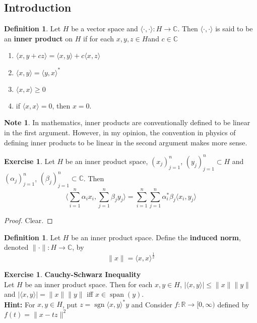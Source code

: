 \documentclass[12pt]{amsart}
\theoremstyle{definition}
\newtheorem{defn}[definition]{Definition}
\newtheorem{note}[definition]{Note}
\newtheorem{ex}[definition]{Exercise}
\newcommand{\al}{\alpha}
\newcommand{\be}{\beta}
\newcommand{\C}{\mathbb{C}}
\newcommand{\R}{\mathbb{R}}
\renewcommand{\r}{\rangle}
\renewcommand{\l}{\langle}
\newcommand{\Rg}{[0,\infty)}
\DeclareMathOperator{\sgn}{sgn}
\DeclareMathOperator{\spn}{span}
\newcommand{\lex}[1]{\label{ex:#1}}
\newcommand{\ld}[1]{\label{defn:#1}}
\begin{document}
	\subsection{Introduction}
	
	\begin{defn} \ld{}
		Let $H$ be a vector space and $\l \cdot, \cdot \r: H \rightarrow \C$. Then $\l \cdot, \cdot \r$ is said to be an \textbf{inner product} on $H$ if for each $x,y,z \in H$and $c \in \C$
		\begin{enumerate}
			\item $\l x , y + cz\r = \l x , y \r + c\l x , z\r $
			\item $\l x , y \r = \l y , x\r^*$
			\item $\l x , x \r \geq 0$
			\item if $\l x ,x \r = 0$, then $x = 0$.  
		\end{enumerate}
	\end{defn}
	
	\begin{note}
	In mathematics, inner products are conventionally defined to be linear in the first argument. However, in my opinion, the convention in physics of defining inner products to be linear in the second argument makes more sense.
	\end{note}
	 
	\begin{ex} \lex{}
	Let $H$ be an inner product space, $(x_j)_{j =1}^n$, $(y_j)_{j =1}^n \subset H$ and $(\al_j)_{j=1}^n$, $(\be_j)_{j=1}^n \subset \C$. Then $$\bigg \l \sum_{i=1}^n \al_i x_i , \sum_{j=1}^n \be_j y_j \bigg \r = \sum_{i=1}^n \sum_{j=1}^n \al_i^*\be_j \l x_i , y_j \r $$
\end{ex}

\begin{proof}
Clear.
\end{proof}

\begin{defn} \ld{}
Let $H$ be an inner product space. Define the \textbf{induced norm}, denoted $\|\cdot \|: H \rightarrow \C$, by $$\|x\| = \l x, x\r^{\frac{1}{2}}$$
\end{defn}

\begin{ex} \lex{} \textbf{Cauchy-Schwarz Inequality}\\
Let $H$ be an inner product space. Then for each $x,y \in H$, $| \l x, y\r | \leq \|x\| \| y\|$ and $| \l x, y\r | = \|x\| \| y\|$ iff $x \in \spn(y)$. \\
\textbf{Hint:} For $x, y \in H$, put $z = \sgn\l x, y \r^*y$ and Consider $f: \R \rightarrow \Rg$ defined by $f(t) = \|x - tz\|^2$
\end{ex}
\end{document}
